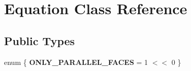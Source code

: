 \hypertarget{classEquation}{\section{Equation Class Reference}
\label{classEquation}
}
\subsection*{Public Types}
\begin{DoxyCompactItemize}
\item 
\hypertarget{classEquation_af2a35278a8179d253298f99de670616d}{enum \{ {\bfseries O\+N\+L\+Y\+\_\+\+P\+A\+R\+A\+L\+L\+E\+L\+\_\+\+F\+A\+C\+E\+S} = 1 $<$$<$ 0
 \}}\label{classEquation_af2a35278a8179d253298f99de670616d}

\end{DoxyCompactItemize}
